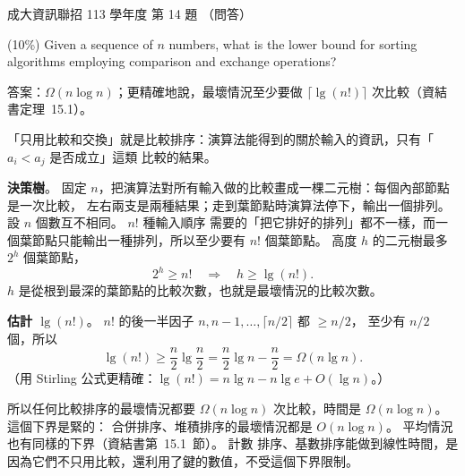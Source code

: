 \begin{pastexam}[label={px:ncku-113-prog-14}]{成大資訊聯招 113 學年度 第 14 題}
（問答）

(10\%) Given a sequence of $n$ numbers, what is the lower bound for sorting algorithms employing
comparison and exchange operations?
\end{pastexam}

\begin{pastsoln}
答案：$\Omega(n \log n)$；更精確地說，最壞情況至少要做 $\lceil \lg(n!) \rceil$ 次比較（資結書定理~15.1）。

「只用比較和交換」就是比較排序：演算法能得到的關於輸入的資訊，只有「$a_i < a_j$ 是否成立」這類
比較的結果。

\textbf{決策樹}。 固定 $n$，把演算法對所有輸入做的比較畫成一棵二元樹：每個內部節點是一次比較，
左右兩支是兩種結果；走到葉節點時演算法停下，輸出一個排列。 設 $n$ 個數互不相同。 $n!$ 種輸入順序
需要的「把它排好的排列」都不一樣，而一個葉節點只能輸出一種排列，所以至少要有 $n!$ 個葉節點。
高度 $h$ 的二元樹最多 $2^h$ 個葉節點，
\[
2^h \ge n! \quad\Longrightarrow\quad h \ge \lg(n!) .
\]
$h$ 是從根到最深的葉節點的比較次數，也就是最壞情況的比較次數。

\textbf{估計 $\lg(n!)$}。 $n!$ 的後一半因子 $n, n - 1, \ldots, \lceil n/2 \rceil$ 都 $\ge n/2$，
至少有 $n/2$ 個，所以
\[
\lg(n!) \ge \frac{n}{2} \lg \frac{n}{2} = \frac{n}{2}\lg n - \frac{n}{2} = \Omega(n \lg n).
\]
（用 Stirling 公式更精確：$\lg(n!) = n \lg n - n \lg e + O(\lg n)$。）

所以任何比較排序的最壞情況都要 $\Omega(n \log n)$ 次比較，時間是 $\Omega(n \log n)$。 這個下界是緊的：
合併排序、堆積排序的最壞情況都是 $O(n \log n)$。 平均情況也有同樣的下界（資結書第~15.1~節）。 計數
排序、基數排序能做到線性時間，是因為它們不只用比較，還利用了鍵的數值，不受這個下界限制。
\end{pastsoln}

